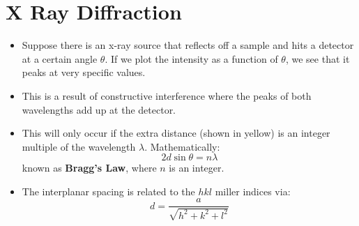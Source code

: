 \section{X Ray Diffraction}
\begin{itemize}
    \item Suppose there is an x-ray source that reflects off a sample and hits a detector at a certain angle $\theta$. If we plot the intensity as a function of $\theta$, we see that it peaks at very specific values.
    \begin{center}
    \end{center}
    \item This is a result of constructive interference where the peaks of both wavelengths add up at the detector.
    \item This will only occur if the extra distance (shown in yellow) is an integer multiple of the wavelength $\lambda$. Mathematically:
    \begin{equation}
        2d\sin\theta = n\lambda
    \end{equation}
    known as \textbf{Bragg's Law}, where $n$ is an integer.
    \item The interplanar spacing is related to the $hkl$ miller indices via:
    \begin{equation}
        d = \frac{a}{\sqrt{h^2+k^2+l^2}}
    \end{equation}
\end{itemize}